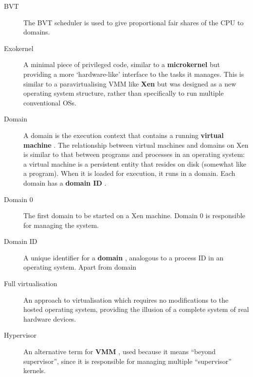 \documentclass[11pt,twoside,final,openright]{xenstyle}
\begin{document}
{\begin{description}
\item[BVT]                 The BVT scheduler is used to give proportional
                           fair shares of the CPU to domains.

\item[Exokernel]           A minimal piece of privileged code, similar to
                           a {\bf microkernel} but providing a more
                           `hardware-like' interface to the tasks it
                           manages.  This is similar to a paravirtualising
                           VMM like {\bf Xen} but was designed as a new
                           operating system structure, rather than
                           specifically to run multiple conventional OSs.

\item[Domain]              A domain is the execution context that
                           contains a running { \bf virtual machine }.
                           The relationship between virtual machines
                           and domains on Xen is similar to that between
                           programs and processes in an operating
                           system: a virtual machine is a persistent
                           entity that resides on disk (somewhat like
                           a program).  When it is loaded for execution,
                           it runs in a domain.  Each domain has a
                           { \bf domain ID }.

\item[Domain 0]            The first domain to be started on a Xen
                           machine.  Domain 0 is responsible for managing
                           the system.

\item[Domain ID]           A unique identifier for a { \bf domain },
                           analogous to a process ID in an operating
                           system.  Apart from domain

\item[Full virtualisation] An approach to virtualisation which
                           requires no modifications to the hosted
                           operating system, providing the illusion of
                           a complete system of real hardware devices.

\item[Hypervisor]          An alternative term for { \bf VMM }, used
                           because it means ``beyond supervisor'',
                           since it is responsible for managing multiple
                           ``supervisor'' kernels.


\end{description}}
\end{document}
